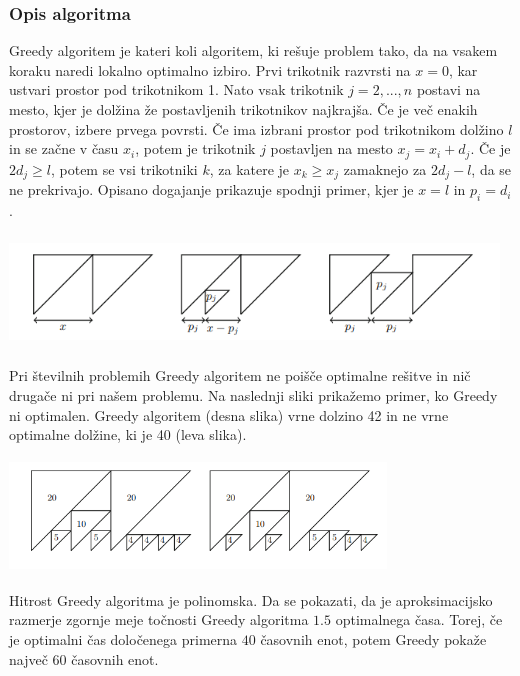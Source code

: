 \documentclass[a4paper,12pt]{article}
\theoremstyle{definition}
\theoremstyle{plain}
\begin{document}
\subsubsection{Opis algoritma}
Greedy algoritem je kateri koli algoritem, ki rešuje problem tako, da na vsakem koraku naredi lokalno optimalno izbiro. Prvi trikotnik razvrsti na $x=0$, kar ustvari prostor pod trikotnikom 1.
Nato vsak trikotnik $j=2,...,n$ postavi na mesto, kjer je dolžina že postavljenih trikotnikov najkrajša. Če je več enakih prostorov, izbere prvega povrsti.
Če ima izbrani prostor pod trikotnikom dolžino $l$ in se začne v času $x_i$, potem je trikotnik $j$ postavljen na mesto $x_j=x_i+d_j$. Če je $2d_j \ge l$,  potem se vsi trikotniki $k$, za katere je $x_k \ge x_j$ zamaknejo za $ 2d_j-l$, da se ne prekrivajo. Opisano 
dogajanje prikazuje spodnji primer, kjer je $x=l$ in $ p_i = d_i $.
\begin{center}
    \includegraphics[width=13cm, height=3cm]{greedy.png} 
 \end{center}
Pri številnih problemih Greedy algoritem ne poišče optimalne rešitve in nič drugače ni pri našem problemu.
Na naslednji sliki prikažemo primer, ko Greedy ni optimalen. Greedy algoritem (desna slika) vrne dolzino 42 in ne vrne optimalne dolžine, ki je 40 (leva slika).
\begin{center}
    \includegraphics[width=10cm, height=3cm]{primer_neoptimalnosti_greedy.png} 
 \end{center}
Hitrost Greedy algoritma je polinomska. Da se pokazati, da je aproksimacijsko razmerje zgornje meje točnosti Greedy algoritma $1.5$ optimalnega časa. Torej, če je optimalni čas določenega primerna
$40$ časovnih enot, potem Greedy pokaže največ $60$ časovnih enot.
\end{document}
